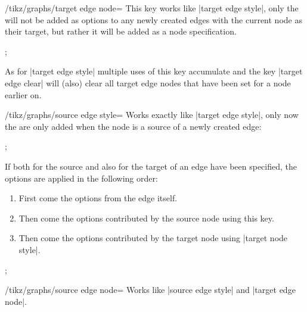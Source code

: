 \begin{key}{/tikz/graphs/target edge node=}
    This key works like |target edge style|, only the 
    will not be added as options to any newly created edges with the current
    node as their target, but rather it will be added as a node specification.
\begin{codeexample}[preamble={\usetikzlibrary{graphs}}]
\tikz {};
\end{codeexample}
    As for |target edge style| multiple uses of this key accumulate and the key
    |target edge clear| will (also) clear all target edge nodes that have been
    set for a node earlier on.
\end{key}

\begin{key}{/tikz/graphs/source edge style=}
    Works exactly like |target edge style|, only now the  are
    only added when the node is a source of a newly created edge:
\begin{codeexample}[preamble={\usetikzlibrary{graphs}}]
\tikz {};
\end{codeexample}
    If both for the source and also for the target of an edge 
    have been specified, the options are applied in the following order:
    \begin{enumerate}
        \item First come the options from the edge itself.
        \item Then come the options contributed by the source node using this
            key.
        \item Then come the options contributed by the target node using
            |target node style|.
    \end{enumerate}
\begin{codeexample}[preamble={\usetikzlibrary{graphs}}]
\tikz {};
\end{codeexample}
\end{key}

\begin{key}{/tikz/graphs/source edge node=}
    Works like |source edge style| and |target edge node|.
\end{key}

